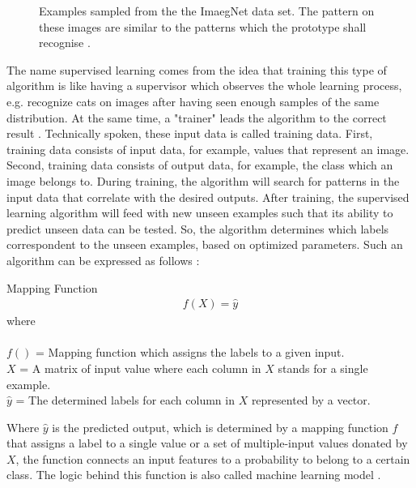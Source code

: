 \begin{figure}[htp]
	\caption{Examples sampled from the the ImaegNet data set. The pattern on these images are similar to the patterns which the prototype shall recognise \cite{Building13:online}.}
	\label{fig:06_example_dog_vs_cat_dataset}
\end{figure}

The name supervised learning comes from the idea that training this type of algorithm is like having a supervisor which observes the whole learning process, e.g. recognize cats on images after having seen enough samples of the same distribution. At the same time, a "trainer" leads the algorithm to the correct result \cite[p. 103]{Goodfellow-et-al-2016} \cite[p. 3]{Murphy2012}. Technically spoken, these input data is called training data. First, training data consists of input data, for example, values that represent an image. Second, training data consists of output data, for example, the class which an image belongs to. During training, the algorithm will search for patterns in the input data that correlate with the desired outputs. After training, the supervised learning algorithm will feed with new unseen examples such that its ability to predict unseen data can be tested. So, the algorithm determines which labels correspondent to the unseen examples, based on optimized parameters. Such an algorithm can be expressed as follows \cite[p. 3]{Murphy2012}:

\begin{definition}[label=def:mapping_function]{Mapping Function}
	\begin{align*}
		f(X) = \hat{y}
	\end{align*}
	where \\\\
	\( f() \) = Mapping function which assigns the labels to a given input. \\
	\( X \)   = A matrix of input value where each column in \( X \) stands for a single example. \\
	\( \hat{y}\) = The determined labels for each column in \( X \) represented by a vector.\\
\end{definition}

Where \(\hat{y}\) is the predicted output, which is determined by a mapping function \(f\) that assigns a label to a single value or a set of multiple-input values donated by \(X\), the function connects an input features to a probability to belong to a certain class. The logic behind this function is also called machine learning model \cite[p. 3]{Murphy2012}.\\

